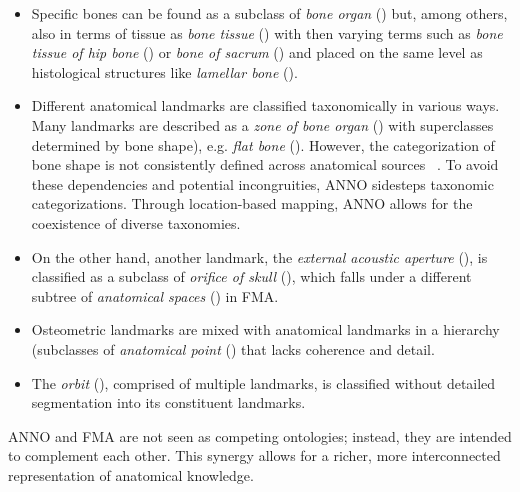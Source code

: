 \documentclass[sw]{iosart2x}
\begin{document}
\begin{itemize}
\item Specific bones can be found as a subclass of \emph{bone organ} () but, among others, also in terms of tissue as \emph{bone tissue} () with then varying terms such as \emph{bone tissue of hip bone} () or \emph{bone of sacrum} () and placed on the same level as histological structures like \emph{lamellar bone} ().
\item Different anatomical landmarks are classified taxonomically in various ways.
Many landmarks are described as a \emph{zone of bone organ} () with superclasses determined by bone shape), e.g. \emph{flat bone} ().
However, the categorization of bone shape is not consistently defined across anatomical sources ~\citep{anatomiedesmenschen,forensicmanual}.
To avoid these dependencies and potential incongruities, ANNO sidesteps taxonomic categorizations.
Through location-based mapping, ANNO allows for the coexistence of diverse taxonomies.
\item On the other hand, another landmark, the \emph{external acoustic aperture} (), is classified as a subclass of \emph{orifice of skull} (), which falls under a different subtree of \emph{anatomical spaces} () in FMA.
\item Osteometric landmarks are mixed with anatomical landmarks in a hierarchy (subclasses of \emph{anatomical point} () that lacks coherence and detail.
\item The \emph{orbit} (), comprised of multiple landmarks, is classified without detailed segmentation into its constituent landmarks.
\end{itemize}

ANNO and FMA are not seen as competing ontologies; instead, they are intended to complement each other.
This synergy allows for a richer, more interconnected representation of anatomical knowledge.
\end{document}
